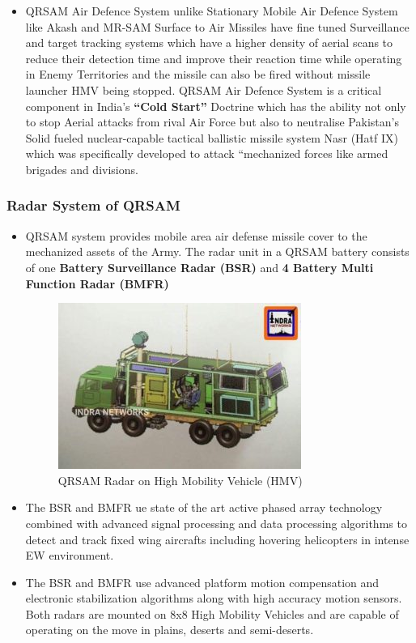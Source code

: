 \documentclass[14pt]{article} %
\begin{document}
\begin{itemize}
\item[] QRSAM Air Defence System unlike Stationary Mobile Air Defence System like Akash and MR-SAM Surface to Air Missiles have fine tuned Surveillance and target tracking systems which have a higher density of aerial scans to reduce their detection time and improve their reaction time while operating in Enemy Territories and the missile can also be fired without missile launcher HMV being stopped. QRSAM Air Defence System is a critical component in India’s \textbf{“Cold Start”} Doctrine which has the ability not only to stop Aerial attacks from rival Air Force but also to neutralise Pakistan’s Solid fueled nuclear-capable tactical ballistic missile system Nasr (Hatf IX) which was specifically developed to attack “mechanized forces like armed brigades and divisions.
\end{itemize}

\subsubsection{Radar System of QRSAM}
\begin{itemize}
\item QRSAM system provides mobile area air defense missile cover to the mechanized assets of the Army. The radar unit in a QRSAM battery consists of one \textbf{Battery Surveillance Radar (BSR)} and \textbf{4 Battery Multi Function Radar (BMFR)}
 \begin{figure}[H]
 \centering
    \includegraphics[width=0.7\linewidth]{qrsamradar.jpg}
  \caption{QRSAM Radar on High Mobility Vehicle (HMV)}
  \label{fig:figure 3}
\end{figure}
\item The BSR and BMFR ue state of the art active phased array technology combined with advanced signal processing and data processing algorithms to detect and track fixed wing aircrafts including hovering helicopters in intense EW environment.

\item The BSR and BMFR use advanced platform motion compensation and electronic stabilization algorithms along with high accuracy motion sensors. Both radars are mounted on 8x8 High Mobility Vehicles and are capable of operating on the move in plains, deserts and semi-deserts.
\end{itemize}
\end{document}
